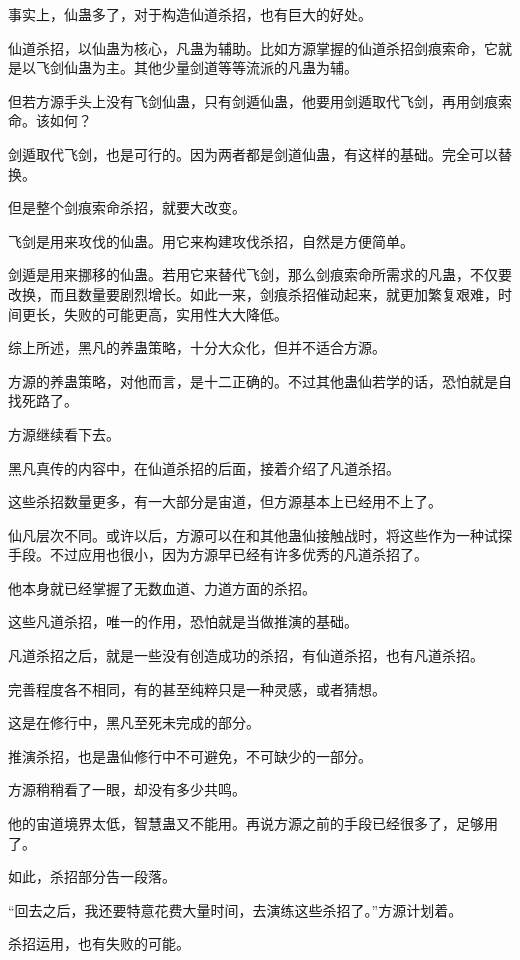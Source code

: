\begin{this_body}
事实上，仙蛊多了，对于构造仙道杀招，也有巨大的好处。

仙道杀招，以仙蛊为核心，凡蛊为辅助。比如方源掌握的仙道杀招剑痕索命，它就是以飞剑仙蛊为主。其他少量剑道等等流派的凡蛊为辅。

但若方源手头上没有飞剑仙蛊，只有剑遁仙蛊，他要用剑遁取代飞剑，再用剑痕索命。该如何？

剑遁取代飞剑，也是可行的。因为两者都是剑道仙蛊，有这样的基础。完全可以替换。

但是整个剑痕索命杀招，就要大改变。

飞剑是用来攻伐的仙蛊。用它来构建攻伐杀招，自然是方便简单。

剑遁是用来挪移的仙蛊。若用它来替代飞剑，那么剑痕索命所需求的凡蛊，不仅要改换，而且数量要剧烈增长。如此一来，剑痕杀招催动起来，就更加繁复艰难，时间更长，失败的可能更高，实用性大大降低。

综上所述，黑凡的养蛊策略，十分大众化，但并不适合方源。

方源的养蛊策略，对他而言，是十二正确的。不过其他蛊仙若学的话，恐怕就是自找死路了。

方源继续看下去。

黑凡真传的内容中，在仙道杀招的后面，接着介绍了凡道杀招。

这些杀招数量更多，有一大部分是宙道，但方源基本上已经用不上了。

仙凡层次不同。或许以后，方源可以在和其他蛊仙接触战时，将这些作为一种试探手段。不过应用也很小，因为方源早已经有许多优秀的凡道杀招了。

他本身就已经掌握了无数血道、力道方面的杀招。

这些凡道杀招，唯一的作用，恐怕就是当做推演的基础。

凡道杀招之后，就是一些没有创造成功的杀招，有仙道杀招，也有凡道杀招。

完善程度各不相同，有的甚至纯粹只是一种灵感，或者猜想。

这是在修行中，黑凡至死未完成的部分。

推演杀招，也是蛊仙修行中不可避免，不可缺少的一部分。

方源稍稍看了一眼，却没有多少共鸣。

他的宙道境界太低，智慧蛊又不能用。再说方源之前的手段已经很多了，足够用了。

如此，杀招部分告一段落。

“回去之后，我还要特意花费大量时间，去演练这些杀招了。”方源计划着。

杀招运用，也有失败的可能。


\end{this_body}
